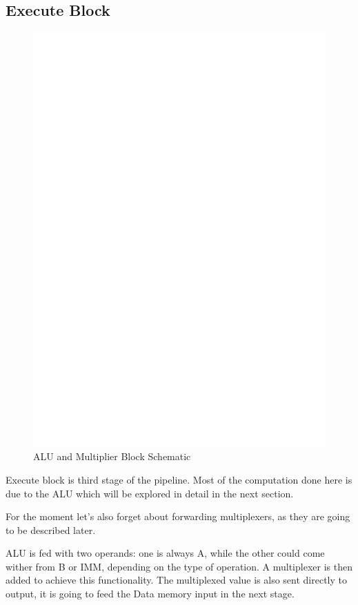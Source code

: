 \documentclass[12pt]{article}
\begin{document}
\subsection{Execute Block}
\begin{figure}[ht!]
	\includegraphics[width=\textwidth, center]{images/DLX_ALU.eps}
	\caption{ALU and Multiplier Block Schematic}
	\label{ALU}
\end{figure}
Execute block is third stage of the pipeline. Most of the computation done here is due to the ALU which will be explored in detail in the next section.

For the moment let's also forget about forwarding multiplexers, as they are going to be described later.

ALU is fed with two operands: one is always A, while the other could come wither from B or IMM, depending on the type of operation. A multiplexer is then added to achieve this functionality.
The multiplexed value is also sent directly to output, it is going to feed the Data memory input in the next stage.
\end{document}
